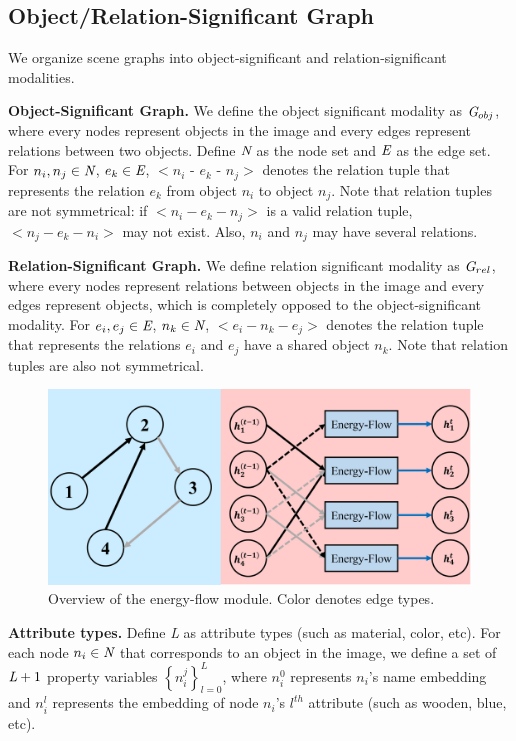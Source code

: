 \documentclass[letterpaper]{article} %
\begin{document}
\subsection{Object/Relation-Significant Graph}
We organize scene graphs into object-significant and relation-significant modalities. 

\medskip
\textbf{Object-Significant Graph.} We define the object significant modality as $\emph{G}_{obj}$, where every nodes represent objects in the image and every edges represent relations between two objects. Define $\emph{N}$ as the node set and $\emph{E}$ as the edge set. For $n_i, n_j \in \emph{N}$, $e_k \in \emph{E}$, $<n_i$ - $e_k$ - $n_j>$ denotes the relation tuple that represents the relation $e_k$ from object $n_i$ to object $n_j$. Note that relation tuples are not symmetrical: if $<n_i - e_k - n_j>$ is a valid relation tuple,  $<n_j - e_k - n_i>$ may not exist. Also, $n_i$ and $n_j$ may have several relations. 

\medskip
\textbf{Relation-Significant Graph.} We define relation significant modality as $\emph{G}_{rel}$, where every nodes represent relations between objects in the image and every edges represent objects, which is completely opposed to the object-significant modality. For $e_i, e_j \in \emph{E}$, $n_k \in \emph{N}$, $<e_i - n_k - e_j>$ denotes the relation tuple that represents the relations $e_i$ and $e_j$ have a shared object $n_k$. Note that relation tuples are also not symmetrical.

\begin{figure}[t] 
    \includegraphics[width=1\textwidth]{./pic/EF2.pdf} 
    \caption{Overview of the energy-flow module. Color denotes edge types.} 
    \label{EF} 
\end{figure}

\medskip
\textbf{Attribute types.} Define \emph{L} as attribute types (such as material, color, etc). 
For each node $n_i\in\emph{N}$ that corresponds to an object in the image, we define a set of $\emph{L}+1$ property variables ${\left\{ n_i^j\right\}}_{l=0}^L$, where $n_i^{0}$ represents $n_i$'s name embedding and $n_i^l$ represents the embedding of node $n_i$'s $l^{th}$ attribute (such as wooden, blue, etc).
\end{document}
